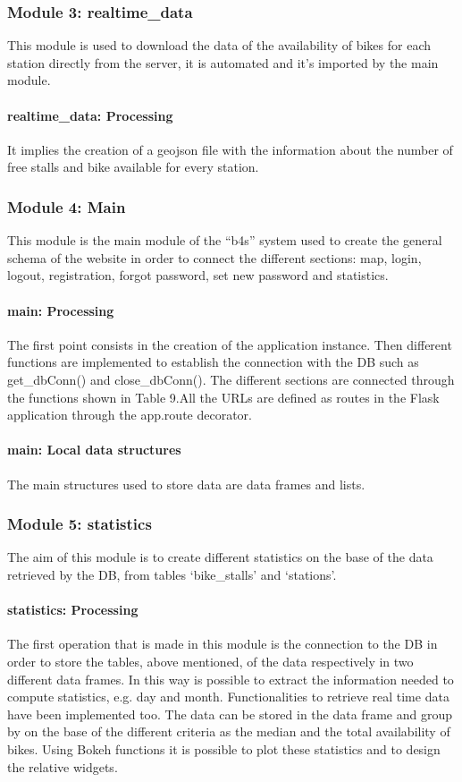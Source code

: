 \documentclass{article}
\begin{document}
\subsubsection{Module 3: realtime\_data}
This module is used to download the data of the availability of bikes for each station directly from the server, it is automated and it’s imported by the main module.

\paragraph{realtime\_data: Processing}
It implies the creation of a geojson file with the information about the number of free stalls and bike available for every station.

\subsubsection{Module 4: Main}
This module is the main module of the “b4s” system used to create the general schema of the website in order to connect the different sections: map, login, logout, registration, forgot password, set new password and statistics.
\paragraph{main: Processing}
The first point consists in the creation of the application instance. Then different functions are implemented to establish the connection with the DB such as get\_dbConn() and close\_dbConn(). The different sections are connected through the functions shown in Table 9.All the URLs are defined as routes in the Flask application through the app.route decorator. 
\paragraph{main: Local data structures}
The main structures used to store data are data frames and lists.

\subsubsection{Module 5: statistics}
The aim of  this module is to create different statistics on the base of the data retrieved by the DB, from tables ‘bike\_stalls’ and ‘stations’.

\paragraph{statistics: Processing}
The first operation that is made in this module is the connection to the DB in order to store the tables, above mentioned, of the data respectively in two different data frames. In this way is possible to extract the information needed to compute statistics, e.g. day and month. Functionalities to retrieve real time data have been implemented too. The data can be stored in the data frame and group by on the base of the different criteria as the median and the total availability of bikes. Using Bokeh functions it is possible to plot these statistics and to design the relative widgets. 
\end{document}
